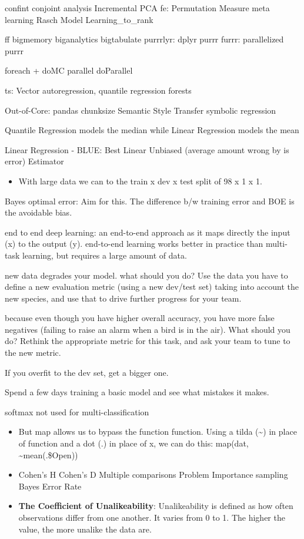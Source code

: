 \documentclass[]{book}
\providecommand{\tightlist}{%
  \setlength{\itemsep}{0pt}\setlength{\parskip}{0pt}}
\begin{document}
confint conjoint analysis Incremental PCA fe: Permutation Measure meta
learning \textbar{} Rasch Model \textbar{} Learning\_to\_rank

ff \textbar{} bigmemory \textbar{} biganalytics \textbar{} bigtabulate
\textbar{} purrrlyr: dplyr purrr \textbar{} furrr: parallelized purrr

foreach + doMC \textbar{} parallel \textbar{} doParallel

ts: Vector autoregression, quantile regression forests

Out-of-Core: pandas chunksize Semantic Style Transfer symbolic
regression

Quantile Regression models the median while Linear Regression models the
mean

Linear Regression - BLUE: Best Linear Unbiased (average amount wrong by
is error) Estimator

\begin{itemize}
\tightlist
\item
  With large data we can to the train x dev x test split of 98 x 1 x 1.
\end{itemize}

Bayes optimal error: Aim for this. The difference b/w training error and
BOE is the avoidable bias.

end to end deep learning: an end-to-end approach as it maps directly the
input (x) to the output (y). end-to-end learning works better in
practice than multi-task learning, but requires a large amount of data.

new data degrades your model. what should you do? Use the data you have
to define a new evaluation metric (using a new dev/test set) taking into
account the new species, and use that to drive further progress for your
team.

because even though you have higher overall accuracy, you have more
false negatives (failing to raise an alarm when a bird is in the air).
What should you do? Rethink the appropriate metric for this task, and
ask your team to tune to the new metric.

If you overfit to the dev set, get a bigger one.

Spend a few days training a basic model and see what mistakes it makes.

softmax not used for multi-classification

\begin{itemize}
\item
  But map allows us to bypass the function function. Using a tilda
  (\textasciitilde{}) in place of function and a dot (.) in place of x,
  we can do this: map(dat, \textasciitilde{}mean(.\$Open))
\item
  Cohen's H \textbar{} Cohen's D \textbar{} Multiple comparisons Problem
  \textbar{} Importance sampling \textbar{} Bayes Error Rate
\item
  \textbf{The Coefficient of Unalikeability}: Unalikeability is defined
  as how often observations differ from one another. It varies from 0 to
  1. The higher the value, the more unalike the data are.
\end{itemize}
\end{document}
